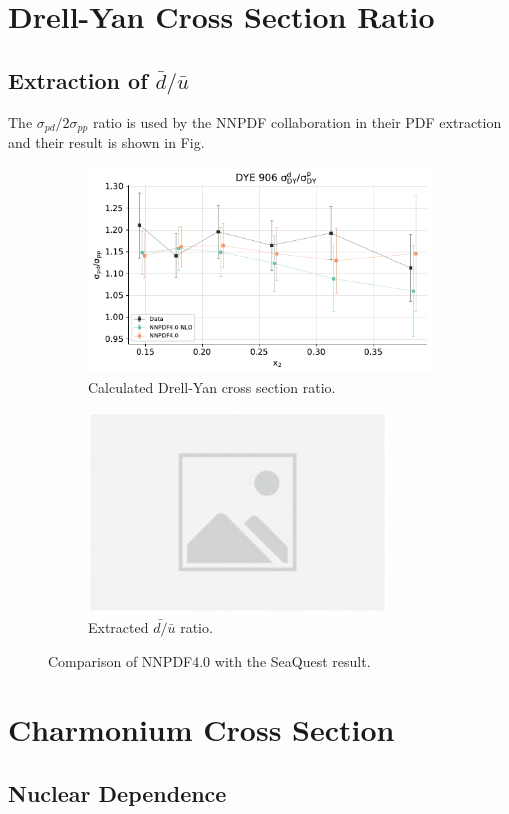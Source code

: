 \section{Drell-Yan Cross Section Ratio}

\subsection{Extraction of \texorpdfstring{$\bar{d}/\bar{u}$}{dbar/ubar}}
The $\sigma_{pd}/2\sigma_{pp}$ ratio is used by the NNPDF collaboration in 
their PDF extraction\cite{ball2021} and their result is shown in Fig.\ 

\begin{figure}[htbp!]
	\centering
	\begin{subfigure}{0.45\linewidth}
		\includegraphics[width=\linewidth]{images/data_vs_theory_nnpdf40_e906}
		\caption{Calculated Drell-Yan cross section ratio.}
		\label{subfig:nnpdf_e906_csr}
	\end{subfigure}
	\begin{subfigure}{0.45\linewidth}
		\includegraphics[width=\linewidth]{images/placeholder}
		\caption{Extracted $\bar{d/}\bar{u}$ ratio.}
		\label{subfig:nnpdf_e906_x2}
	\end{subfigure}
	\caption{Comparison of NNPDF4.0\cite{ball2021} with the SeaQuest 
	result\cite{dove2021}.}
	\label{fig:nnpdf_e906}
\end{figure}

\section{Charmonium Cross Section}

\subsection{Nuclear Dependence}
